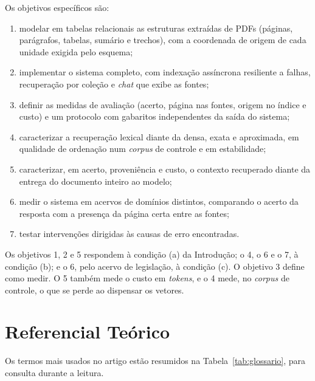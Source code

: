 \documentclass[12pt]{article}
\begin{document}
Os objetivos específicos são:
\begin{enumerate}
  \item modelar em tabelas relacionais as estruturas extraídas de PDFs (páginas, parágrafos, tabelas, sumário e trechos), com a coordenada de origem de cada unidade exigida pelo esquema;
  \item implementar o sistema completo, com indexação assíncrona resiliente a falhas, recuperação por coleção e \emph{chat} que exibe as fontes;
  \item definir as medidas de avaliação (acerto, página nas fontes, origem no índice e custo) e um protocolo com gabaritos independentes da saída do sistema;
  \item caracterizar a recuperação lexical diante da densa, exata e aproximada, em qualidade de ordenação num \emph{corpus} de controle e em estabilidade;
  \item caracterizar, em acerto, proveniência e custo, o contexto recuperado diante da entrega do documento inteiro ao modelo;
  \item medir o sistema em acervos de domínios distintos, comparando o acerto da resposta com a presença da página certa entre as fontes;
  \item testar intervenções dirigidas às causas de erro encontradas.
\end{enumerate}

Os objetivos 1, 2 e 5 respondem à condição (a) da Introdução; o 4, o 6 e o 7, à condição (b); e o 6, pelo acervo de legislação, à condição (c). O objetivo 3 define como medir. O 5 também mede o custo em \emph{tokens}, e o 4 mede, no \emph{corpus} de controle, o que se perde ao dispensar os vetores.

\section{Referencial Teórico}
\label{sec:referencial}

Os termos mais usados no artigo estão resumidos na Tabela~\ref{tab:glossario}, para consulta durante a leitura.
\end{document}
